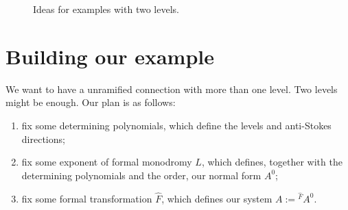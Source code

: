 \begin{figure}[!htbp]
\begin{subfigure}[b]{0.33\textwidth}
  \end{subfigure}
  \caption{Ideas for examples with two levels.}
\end{figure} %

\section{Building our example}
We want to have a unramified connection with more than one level. Two levels
might be enough. Our plan is as follows:
\begin{enumerate}
  \item fix some determining polynomials, which define the levels and
    anti-Stokes directions;
  \item fix some exponent of formal monodromy $L$, which defines, together with
    the determining polynomials and the order, our normal form $A^0$;
  \item fix some formal transformation $\hat F$, which defines our system
    $A:={}^{\hat F}\!A^0$.
\end{enumerate}

